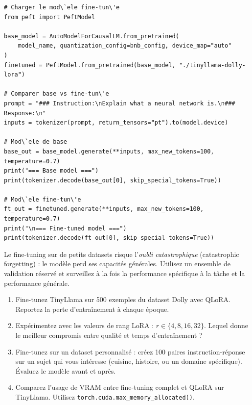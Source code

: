 \begin{verbatim}
# Charger le mod\`ele fine-tun\'e
from peft import PeftModel

base_model = AutoModelForCausalLM.from_pretrained(
    model_name, quantization_config=bnb_config, device_map="auto"
)
finetuned = PeftModel.from_pretrained(base_model, "./tinyllama-dolly-lora")

# Comparer base vs fine-tun\'e
prompt = "### Instruction:\nExplain what a neural network is.\n### Response:\n"
inputs = tokenizer(prompt, return_tensors="pt").to(model.device)

# Mod\`ele de base
base_out = base_model.generate(**inputs, max_new_tokens=100, temperature=0.7)
print("=== Base model ===")
print(tokenizer.decode(base_out[0], skip_special_tokens=True))

# Mod\`ele fine-tun\'e
ft_out = finetuned.generate(**inputs, max_new_tokens=100, temperature=0.7)
print("\n=== Fine-tuned model ===")
print(tokenizer.decode(ft_out[0], skip_special_tokens=True))
\end{verbatim}

\begin{warningbox}
Le fine-tuning sur de petits datasets risque l'\emph{oubli catastrophique} (catastrophic forgetting) : le mod\`ele perd ses capacit\'es g\'en\'erales. Utilisez un ensemble de validation r\'eserv\'e et surveillez \`a la fois la performance sp\'ecifique \`a la t\^ache et la performance g\'en\'erale.
\end{warningbox}

\begin{exercise}
\begin{enumerate}
  \item Fine-tunez TinyLlama sur 500 exemples du dataset Dolly avec QLoRA. Reportez la perte d'entra\^inement \`a chaque \'epoque.
  \item Exp\'erimentez avec les valeurs de rang LoRA : $r \in \{4, 8, 16, 32\}$. Lequel donne le meilleur compromis entre qualit\'e et temps d'entra\^inement ?
  \item Fine-tunez sur un dataset personnalis\'e : cr\'eez 100 paires instruction-r\'eponse sur un sujet qui vous int\'eresse (cuisine, histoire, ou un domaine sp\'ecifique). \'Evaluez le mod\`ele avant et apr\`es.
  \item Comparez l'usage de VRAM entre fine-tuning complet et QLoRA sur TinyLlama. Utilisez \texttt{torch.cuda.max\_memory\_allocated()}.
\end{enumerate}
\end{exercise}


